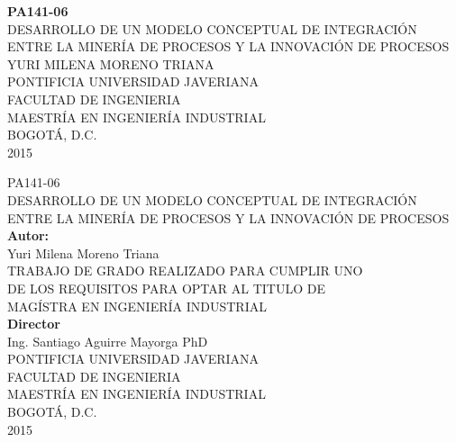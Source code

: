 \documentclass[a4paper, 11pt, titlepage]{article}
\begin{document}
\begin{center}
	\large{\textbf{PA141-06}}\\
	\large{DESARROLLO DE UN MODELO CONCEPTUAL DE INTEGRACIÓN ENTRE LA MINERÍA DE
PROCESOS Y LA INNOVACIÓN DE PROCESOS}\\
	\vspace{7 cm} %
	\large{YURI MILENA MORENO TRIANA}\\
	\vspace{7 cm} %
	\large{PONTIFICIA UNIVERSIDAD JAVERIANA}\\
	\large{FACULTAD DE INGENIERIA}\\
	\large{MAESTRÍA EN INGENIERÍA INDUSTRIAL}\\
	\large{BOGOTÁ, D.C.}\\
	\large{2015}\\
\end{center}
\thispagestyle{empty} %
\newpage
\begin{center}
	\normalsize{PA141-06}\\
	\normalsize{DESARROLLO DE UN MODELO CONCEPTUAL DE INTEGRACIÓN ENTRE LA MINERÍA DE
PROCESOS Y LA INNOVACIÓN DE PROCESOS}\\
	\vspace{2 cm} %
	\normalsize{\textbf{Autor:}}\\
	\normalsize{Yuri Milena Moreno Triana}\\
	\vspace{3 cm} %
	\normalsize{TRABAJO DE GRADO REALIZADO PARA CUMPLIR UNO }\\
	\normalsize{DE LOS REQUISITOS PARA OPTAR AL TITULO DE}\\
	\normalsize{MAGÍSTRA EN INGENIERÍA INDUSTRIAL}\\
	\vspace{3 cm} %
	\normalsize{\textbf{Director}}\\
	\normalsize{Ing. Santiago Aguirre Mayorga PhD}\\
	
	\vspace{2 cm} %
	\normalsize{PONTIFICIA UNIVERSIDAD JAVERIANA}\\
	\normalsize{FACULTAD DE INGENIERIA}\\
	\normalsize{MAESTRÍA EN INGENIERÍA INDUSTRIAL}\\
	\normalsize{BOGOTÁ, D.C.}\\
	\normalsize{2015}\\
\end{center}
\thispagestyle{empty} %
\newpage
\end{document}
